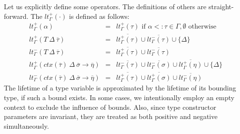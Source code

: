 \documentclass[11pt]{article}
\newcommand{\ap}{~}
\newcommand{\ctx}[1]{ctx\left(#1\right)~}
\begin{document}
    Let us explicitly define some operators.
    The definitions of others are straight-forward.
    The $lt_\Gamma^+(\cdot)$ is defined as follows:
    \[
        \begin{array}{lll}
            lt_\Gamma^+(\alpha) & = & lt_\Gamma^+(\tau) \text{ if } \alpha <: \tau \in \Gamma, \emptyset \text{ otherwise} \\
            lt_\Gamma^+(T\ap\Delta\ap\overline{\tau}) & = & \overline{lt_\Gamma^+(\tau)} \cup \overline{lt_\Gamma^-(\tau)} \cup \{\Delta\} \\
            lt_\Gamma^-(T\ap\Delta\ap\overline{\tau}) & = & \overline{lt_\Gamma^+(\tau)} \cup \overline{lt_\Gamma^-(\tau)} \\
            lt_\Gamma^{+}(\ctx{\overline{\tau}}\Delta~\overline{\sigma}\to\overline{\eta}) & = & \overline{lt_\Gamma^{-}(\tau)} \cup \overline{lt_\Gamma^{-}(\sigma)} \cup \overline{lt_\Gamma^{+}(\eta)} \cup \{\Delta\} \\
            lt_\Gamma^{-}(\ctx{\overline{\tau}}\Delta~\overline{\sigma}\to\overline{\eta}) & = & \overline{lt_\Gamma^{+}(\tau)} \cup \overline{lt_\Gamma^{+}(\sigma)} \cup \overline{lt_\Gamma^{-}(\eta)}
        \end{array}
    \]
    The lifetime of a type variable is approximated by the lifetime of its bounding type, if such a bound exists.
    In some cases, we intentionally employ an empty context to exclude the influence of bounds.
    Also, since type constructor parameters are invariant, they are treated as both positive and negative simultaneously.
\end{document}

